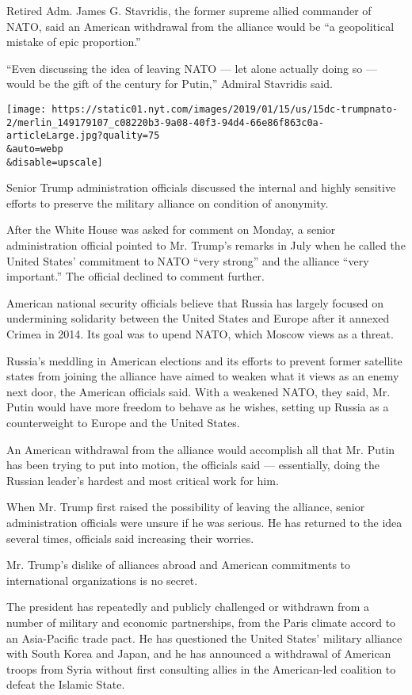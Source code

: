 Retired Adm. James G. Stavridis, the former supreme allied commander of
NATO, said an American withdrawal from the alliance would be ``a
geopolitical mistake of epic proportion.''

``Even discussing the idea of leaving NATO --- let alone actually doing
so --- would be the gift of the century for Putin,'' Admiral Stavridis
said.

\texttt{[image: https://static01.nyt.com/images/2019/01/15/us/15dc-trumpnato-2/merlin\_149179107\_c08220b3-9a08-40f3-94d4-66e86f863c0a-articleLarge.jpg?quality=75\\\&auto=webp\\\&disable=upscale]}

Senior Trump administration officials discussed the internal and highly
sensitive efforts to preserve the military alliance on condition of
anonymity.

After the White House was asked for comment on Monday, a senior
administration official pointed to Mr. Trump's remarks in July when he
called the United States' commitment to NATO ``very strong'' and the
alliance ``very important.'' The official declined to comment further.

American national security officials believe that Russia has largely
focused on undermining solidarity between the United States and Europe
after it annexed Crimea in 2014. Its goal was to upend NATO, which
Moscow views as a threat.

Russia's meddling in American elections and its efforts to prevent
former satellite states from joining the alliance have aimed to weaken
what it views as an enemy next door, the American officials said. With a
weakened NATO, they said, Mr. Putin would have more freedom to behave as
he wishes, setting up Russia as a counterweight to Europe and the United
States.

An American withdrawal from the alliance would accomplish all that Mr.
Putin has been trying to put into motion, the officials said ---
essentially, doing the Russian leader's hardest and most critical work
for him.

When Mr. Trump first raised the possibility of leaving the alliance,
senior administration officials were unsure if he was serious. He has
returned to the idea several times, officials said increasing their
worries.

Mr. Trump's dislike of alliances abroad and American commitments to
international organizations is no secret.

The president has repeatedly and publicly challenged or withdrawn from a
number of military and economic partnerships, from the Paris climate
accord to an Asia-Pacific trade pact. He has questioned the United
States' military alliance with South Korea and Japan, and he has
announced a withdrawal of American troops from Syria without first
consulting allies in the American-led coalition to defeat the Islamic
State.

